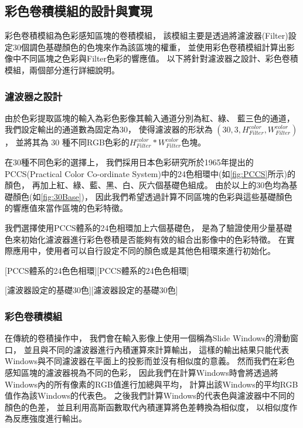 \documentclass[class=NCU_thesis, crop=false]{standalone}
\begin{document}
	\subsection{彩色卷積模組的設計與實現}
		彩色卷積模組為色彩感知區塊的卷積模組，
		該模組主要是透過將濾波器(Filter)設定30個調色基礎顏色的色塊來作為該區塊的權重，
		並使用彩色卷積模組計算出影像中不同區塊之色彩與Filter色彩的響應值。
		以下將針對濾波器之設計、彩色卷積模組，兩個部分進行詳細說明。
		
		\subsubsection{濾波器之設計}
			由於色彩提取區塊的輸入為彩色影像其輸入通道分別為紅、綠、 藍三色的通道，
			我們設定輸出的通道數為固定為30，
			使得濾波器的形狀為 $\left(30 , 3, H^{color}_{Filter},  W^{color}_{Filter} \right)$，
			並將其為 30 種不同RGB色彩的$H^{color}_{Filter} * W^{color}_{Filter}$色塊。

			在30種不同色彩的選擇上，
			我們採用日本色彩研究所於1965年提出的PCCS(Practical Color Co-ordinate System)中的24色相環中(如\cref{fig:PCCS}所示)的顏色，
			再加上紅、綠、藍、黑、白、灰六個基礎色組成。
			由於以上的30色均為基礎顏色(如\cref{fig:30Base})，
			因此我們希望透過計算不同區塊的色彩與這些基礎顏色的響應值來當作區塊的色彩特徵。

			我們選擇使用PCCS體系的24色相環加上六個基礎色，
			是為了驗證使用少量基礎色來初始化濾波器進行彩色卷積是否能夠有效的組合出影像中的色彩特徵。
			在實際應用中，使用者可以自行設定不同的顏色或是其他色相環來進行初始化。

			[PCCS體系的24色色相環\cite{PCCScite}][PCCS體系的24色色相環]

			[濾波器設定的基礎30色][濾波器設定的基礎30色]

		\subsubsection{彩色卷積模組}
			\label{chapter:color_convolution}
			在傳統的卷積操作中，
			我們會在輸入影像上使用一個稱為Slide Windows的滑動窗口，
			並且與不同的濾波器進行內積運算來計算輸出，
			這樣的輸出結果只能代表Windows與不同濾波器在平面上的投影而並沒有相似度的意義。
			然而我們在彩色感知區塊的濾波器視為不同的色彩，
			因此我們在計算Windows時會將透過將Windows內的所有像素的RGB值進行加總與平均，
			計算出該Windows的平均RGB值作為該Windows的代表色。
			之後我們計算Windows的代表色與濾波器中不同的顏色的色差，
			並且利用高斯函數取代內積運算將色差轉換為相似度，
			以相似度作為反應強度進行輸出。
\end{document}
